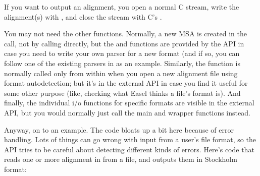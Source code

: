 If you want to output an alignment, you open a normal C 
stream, write the alignment(s) with , and
close the stream with C's .

You may not need the other functions.  Normally, a new MSA is created
in the  call, not by calling
 directly, but the  and
 functions are provided by the API in case you need
to write your own parser for a new format (and if so, you can follow
one of the existing parsers in  as an example. Similarly,
the  function is normally called
only from within  when you open a new
alignment file using format autodetection; but it's in the external
API in case you find it useful for some other purpose (like, checking
what Easel thinks a file's format is). And finally, the individual i/o
functions for specific formats are visible in the external API, but
you would normally just call the main  and
 wrapper functions instead.

Anyway, on to an example. The code bloats up a bit here because of
error handling. Lots of things can go wrong with input from a user's
file format, so the API tries to be careful about detecting different
kinds of errors. Here's code that reads one or more alignment in from
a file, and outputs them in Stockholm format:

